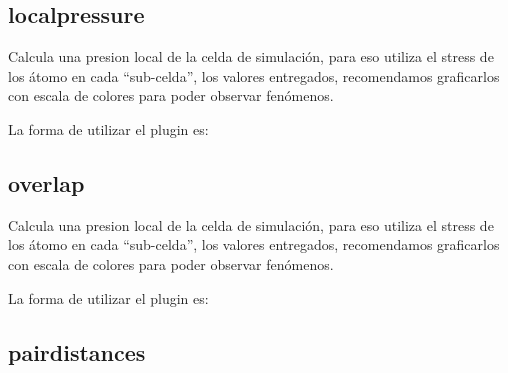 
\subsection{localpressure}

Calcula una presion local de la celda de simulaci\'on, para eso utiliza el stress de los \'atomo en cada ``sub-celda'', los valores entregados, recomendamos graficarlos con escala de colores para poder observar fen\'omenos. 

La forma de utilizar el plugin es:

\subsection{overlap}

Calcula una presion local de la celda de simulaci\'on, para eso utiliza el stress de los \'atomo en cada ``sub-celda'', los valores entregados, recomendamos graficarlos con escala de colores para poder observar fen\'omenos. 

La forma de utilizar el plugin es:

\subsection{pairdistances}

